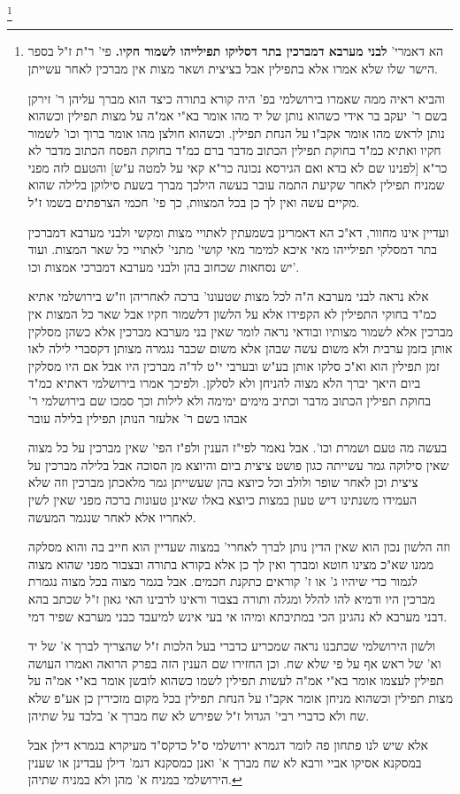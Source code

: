 \documentclass[12pt, openany]{book}
\newcommand{\footnotecomment}[1]{
	\renewcommand\thefootnote{}
	\footnote{#1}}
\newcommand{\commenta}[1]{\footnotecomment{#1}}
\begin{document}
{\commenta{ הא דאמרי' \textbf{לבני מערבא דמברכין בתר דסליקו תפילייהו לשמור חקיו.} פי' ר"ת ז"ל בספר הישר שלו שלא אמרו אלא בתפילין אבל בציצית ושאר מצות אין מברכין לאחר עשייתן.\par והביא ראיה ממה שאמרו בירושלמי בפ' היה קורא בתורה כיצד הוא מברך עליהן ר' זירקן בשם ר' יעקב בר אידי כשהוא נותן של יד מהו אומר בא"י אמ"ה על מצות תפילין וכשהוא נותן לראש מהו אומר אקב"ו על הנחת תפילין. וכשהוא חולצן מהו אומר ברוך וכו' לשמור חקיו ואתיא כמ"ד בחוקת תפילין הכתוב מדבר ברם כמ"ד בחוקת הפסח הכתוב מדבר לא כר"א [{\small לפנינו שם } לא בדא {\small ואם הגירסא נכונה } כר"א קאי על למטה ע"ש] והטעם לזה מפני שמניח תפילין לאחר שקיעת התמה עובר בעשה הילכך מברך בשעת סילוקן בלילה שהוא מקיים עשה ואין לך כן בכל המצוות, כך פי' חכמי הצרפתים בשמו ז"ל.\par ועדיין אינו מחוור, דא"כ הא דאמרינן בשמעתין לאתויי מצות ומקשי ולבני מערבא דמברכין בתר דמסלקי תפילייהו מאי איכא למימר מאי קושי' מתני' לאתויי כל שאר המצות. ועוד יש נסחאות שכחוב בהן ולבני מערבא דמברכי אמצות וכו'.\par אלא נראה לבני מערבא ה"ה לכל מצות שטעונו' ברכה לאחריהן וז"ש בירושלמי אתיא כמ"ד בחוקי התפילין לא הקפידו אלא על הלשון דלשמור חקיו אבל שאר כל המצות אין מברכין אלא לשמור מצותיו ובודאי נראה לומר שאין בני מערבא מברכין אלא כשהן מסלקין אותן בזמן ערבית ולא משום עשה שבהן אלא משום שכבר נגמרה מצותן דקסברי לילה לאו זמן תפילין הוא וא"כ סלקו אותן בע"ש ובערבי י"ט לד"ה מברכין היו אבל אם היו מסלקין ביום היאך יברך הלא מצוה להניחן ולא לסלקן. ולפיכך אמרו בירושלמי דאתיא כמ"ד בחוקת תפילין הכתוב מדבר וכתיב מימים ימימה ולא לילות וכך סמכו שם בירושלמי ר' אבהו בשם ר' אלעזר הנותן תפילין בלילה עובר\par בעשה מה טעם ושמרת וכו'. אבל נאמר לפי"ז הענין ולפ"ז הפי' שאין מברכין על כל מצוה שאין סילוקה גמר עשייתה כגון פושט ציצית ביום והיוצא מן הסוכה אבל בלילה מברכין על ציצית וכן לאחר שופר ולולב וכל כיוצא בהן שעשייתן גמר מלאכתן מברכין וזה שלא העמידו משנתינו דיש טעון במצות כיוצא באלו שאינן טעונות ברכה מפני שאין לשין לאחריו אלא לאחר שנגמר המעשה.\par וזה הלשון נכון הוא שאין הדין נותן לברך לאחרי' במצוה שעדיין הוא חייב בה והוא מסלקה ממנו שא"כ מצינו חוטא ומברך ואין לך כן אלא בקורא בתורה ובצבור מפני שהוא מצוה לגמור כדי שיהיו ג' או ז' קוראים כתקנת חכמים. אבל בגמר מצוה בכל מצוה נגמרת מברכין היו ודמיא להו להלל ומגלה ותורה בצבור וראינו לרבינו האי גאון ז"ל שכתב בהא דבני מערבא לא נהגינן הכי במתיבתא ומיהו אי בעי אינש למיעבד כבני מערבא שפיר דמי.\par ולשון הירושלמי שכתבנו נראה שמכריע כדברי בעל הלכות ז"ל שהצריך לברך א' של יד וא' של ראש אף על פי שלא שח. וכן החזירו שם הענין הזה בפרק הרואה ואמרו העושה תפילין לעצמו אומר בא"י אמ"ה לעשות תפילין לשמו כשהוא לובשן אומר בא"י אמ"ה על מצות תפילין וכשהוא מניחן אומר אקב"ו על הנחת תפילין בכל מקום מזכירין כן אע"פ שלא שח ולא כדברי רבי' הגדול ז"ל שפירש לא שח מברך א' בלבד על שתיהן.\par אלא שיש לנו פתחון פה לומר דגמרא ירושלמי ס"ל כדקס"ד מעיקרא בגמרא דילן אבל במסקנא אסיקו אביי ורבא לא שח מברך א' ואנן כמסקנא דגמ' דילן עבדינן או שענין הירושלמי במניח א' מהן ולא במניח שתיהן. }
}
\end{document}
